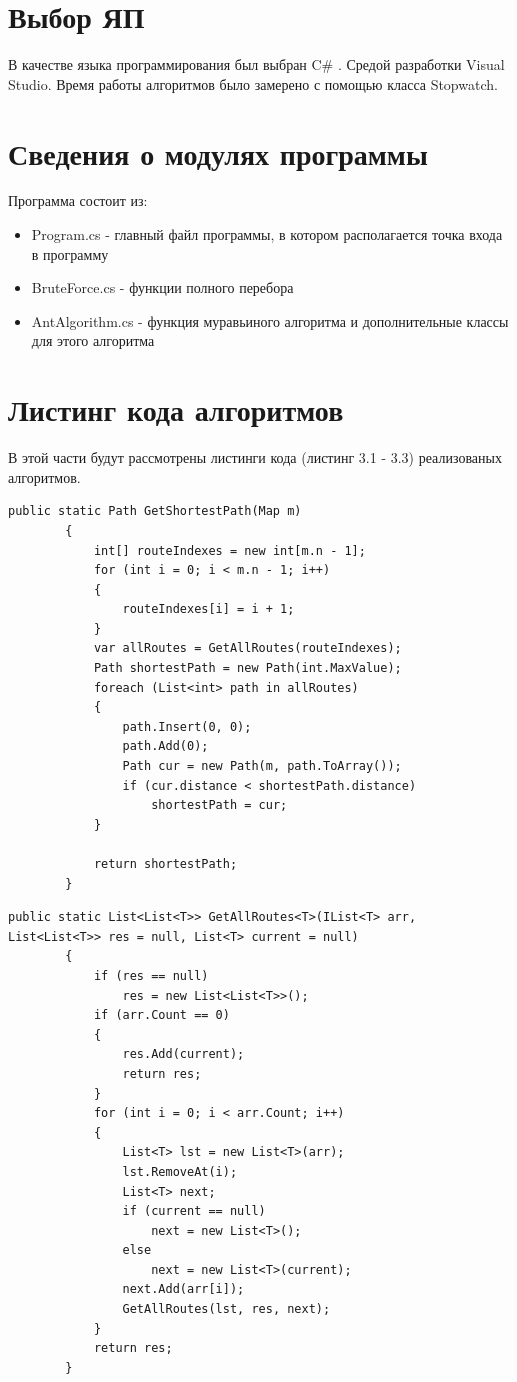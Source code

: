 \documentclass[12pt]{report}
\begin{document}
\section{Выбор ЯП}
В качестве языка программирования был выбран C\# \cite{Microsoft}. Средой разработки Visual Studio. 
Время работы алгоритмов было замерено с помощью класса Stopwatch. 

\section{Сведения о модулях программы}
Программа состоит из:
\begin{itemize}
	\item Program.cs - главный файл программы, в котором располагается точка входа в программу
	\item BruteForce.cs - функции полного перебора
	\item AntAlgorithm.cs - функция муравьиного алгоритма и дополнительные классы для этого алгоритма
\end{itemize}


\section{Листинг кода алгоритмов}
В этой части будут рассмотрены листинги кода (листинг 3.1 - 3.3) реализованых алгоритмов.
\begin{lstlisting}[label=some-code,caption=Алгоритм поиска полным перебором]
public static Path GetShortestPath(Map m)
        {
            int[] routeIndexes = new int[m.n - 1];
            for (int i = 0; i < m.n - 1; i++)
            {
                routeIndexes[i] = i + 1;
            }
            var allRoutes = GetAllRoutes(routeIndexes);
            Path shortestPath = new Path(int.MaxValue);
            foreach (List<int> path in allRoutes)
            {
                path.Insert(0, 0);
                path.Add(0);
                Path cur = new Path(m, path.ToArray());
                if (cur.distance < shortestPath.distance)
                    shortestPath = cur;
            }

            return shortestPath;
        }
\end{lstlisting}

\begin{lstlisting}[label=some-code,caption=Алгоритм поиска всех перестановок]
public static List<List<T>> GetAllRoutes<T>(IList<T> arr, List<List<T>> res = null, List<T> current = null)
        {
            if (res == null)
                res = new List<List<T>>();
            if (arr.Count == 0)
            {
                res.Add(current);
                return res;
            }
            for (int i = 0; i < arr.Count; i++)
            {
                List<T> lst = new List<T>(arr);
                lst.RemoveAt(i);
                List<T> next;
                if (current == null)
                    next = new List<T>();
                else
                    next = new List<T>(current);
                next.Add(arr[i]);
                GetAllRoutes(lst, res, next);
            }
            return res;
        }
\end{lstlisting}
\end{document}
